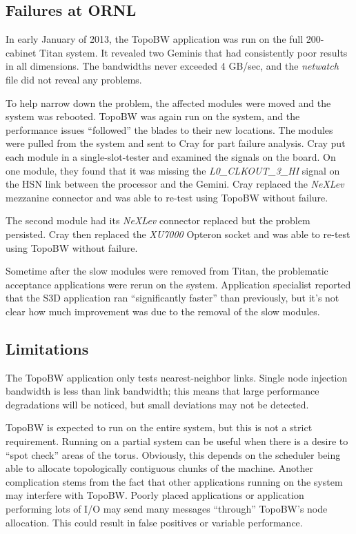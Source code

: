 \documentclass[10pt, conference, compsocconf]{IEEEtran}
\begin{document}
\subsection{Failures at ORNL}

In early January of 2013, the TopoBW application was run on the full
200-cabinet Titan system.  It revealed two Geminis that had consistently poor
results in all dimensions.  The bandwidths never exceeded 4 GB/sec, and the
\emph{netwatch} file did not reveal any problems.

To help narrow down the problem, the affected modules were moved and the system
was rebooted.  TopoBW was again run on the system, and the performance issues
``followed'' the blades to their new locations.  The modules were pulled from
the system and sent to Cray for part failure analysis.  Cray put each module in
a single-slot-tester and examined the signals on the board.  On one module,
they found that it was missing the \emph{L0\_CLKOUT\_3\_HI} signal on the HSN
link between the processor and the Gemini.  Cray replaced the \emph{NeXLev}
mezzanine connector and was able to re-test using TopoBW without failure.

The second module had its \emph{NeXLev} connector replaced but the problem
persisted.  Cray then replaced the \emph{XU7000} Opteron socket and was able to
re-test using TopoBW without failure.

Sometime after the slow modules were removed from Titan, the problematic
acceptance applications were rerun on the system.  Application specialist
reported that the S3D application ran ``significantly faster'' than previously,
but it's not clear how much improvement was due to the removal of the slow
modules.

\subsection{Limitations}

The TopoBW application only tests nearest-neighbor links. Single node injection
bandwidth is less than link bandwidth; this means that large performance
degradations will be noticed, but small deviations may not be detected.

TopoBW is expected to run on the entire system, but this is not a strict
requirement.  Running on a partial system can be useful when there is a desire
to ``spot check'' areas of the torus.  Obviously, this depends on the scheduler
being able to allocate topologically contiguous chunks of the machine.  Another
complication stems from the fact that other applications running on the system
may interfere with TopoBW.  Poorly placed applications or application
performing lots of I/O may send many messages ``through'' TopoBW's node
allocation.  This could result in false positives or variable performance.
\end{document}
